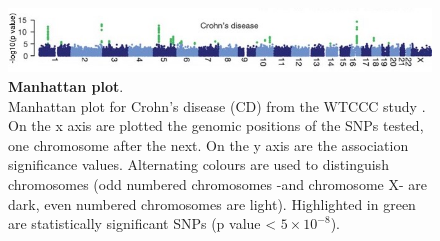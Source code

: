 \begin{figure}[h]
\centering
\includegraphics[width=15cm]{Chapter1/Fig/Manhattan_plots_CD_WTCCC_2007.jpg}
\caption[Manhattan plot]{\textbf{Manhattan plot}.\\
Manhattan plot for Crohn's disease (CD) from the WTCCC study \cite{wellcome2007genome}.
On the x axis are plotted the genomic positions of the SNPs tested, one chromosome after the next.
On the y axis are the association significance values.  
Alternating colours are used to distinguish chromosomes (odd numbered chromosomes -and chromosome X- are dark, even numbered chromosomes are light).
Highlighted in green are statistically significant SNPs (p value < $5 \times 10^{-8}$).}
\label{fig:manhattan}
\end{figure}





